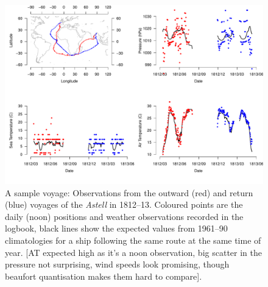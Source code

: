 \documentclass[a4paper,11pt]{article}
\begin{document}
\begin{figure}
\begin{center}
\includegraphics[angle=0, width=1.0\textwidth]{../individual_logs/Astell_1812-13/Astell}
\caption{A sample voyage: Observations from the outward (red) and return (blue) voyages of the {\it Astell} in 1812--13. Coloured points are the daily (noon) positions and weather observations recorded in the logbook, black lines show the expected values from 1961--90 climatologies for a ship following the same route at the same time of year. [AT expected high as it's a noon observation, big scatter in the pressure not surprising, wind speeds look promising, though beaufort quantisation makes them hard to compare].}
\label{astell}
\end{center}
\end{figure}
\end{document}
